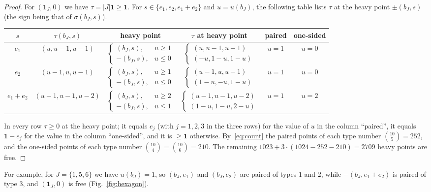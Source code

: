 \documentclass[11pt]{article}
\newcommand{\1}{\mathbf{1}}
\begin{document}
\begin{proof}
For $(\1_J,0)$ we have $\tau=|J|\1\ge\1$. For $s\in\{e_1,e_2,e_1+e_2\}$ and $u=u(b_J)$, the following table lists $\tau$ at
the heavy point $\pm(b_J,s)$ (the sign being that of $\sigma(b_J,s)$).
\begin{center}
\setlength{\tabcolsep}{5pt}
\begin{tabular}{cccccc}
\toprule
$s$ & $\tau(b_J,s)$ & heavy point & $\tau$ at heavy point & paired & one-sided\\
\midrule
$e_1$ & $(u,u-1,u-1)$ & $\begin{cases}(b_J,s),&u\ge1\\-(b_J,s),&u\le0\end{cases}$ &
$\begin{cases}(u,u-1,u-1)\\(-u,1-u,1-u)\end{cases}$ & $u=1$ & $u=0$\\
\addlinespace
$e_2$ & $(u-1,u,u-1)$ & $\begin{cases}(b_J,s),&u\ge1\\-(b_J,s),&u\le0\end{cases}$ &
$\begin{cases}(u-1,u,u-1)\\(1-u,-u,1-u)\end{cases}$ & $u=1$ & $u=0$\\
\addlinespace
$e_1+e_2$ & $(u-1,u-1,u-2)$ & $\begin{cases}(b_J,s),&u\ge2\\-(b_J,s),&u\le1\end{cases}$ &
$\begin{cases}(u-1,u-1,u-2)\\(1-u,1-u,2-u)\end{cases}$ & $u=1$ & $u=2$\\
\bottomrule
\end{tabular}
\end{center}
In every row $\tau\ge0$ at the heavy point; it equals $e_j$ (with $j=1,2,3$ in the three rows) for the value of $u$ in the
column ``paired'', it equals $\1-e_j$ for the value in the column ``one-sided'', and it is $\ge\1$ otherwise.
By~\eqref{eq:count} the paired points of each type number $\binom{10}{5}=252$, and the one-sided points of each type number
$\binom{10}{4}=\binom{10}{6}=210$. The remaining $1023+3\cdot(1024-252-210)=2709$ heavy points are free.
\end{proof}

For example, for $J=\{1,5,6\}$ we have $u(b_J)=1$, so $(b_J,e_1)$ and $(b_J,e_2)$ are paired of types $1$ and $2$, while
$-(b_J,e_1+e_2)$ is paired of type $3$, and $(\1_J,0)$ is free (Fig.~\ref{fig:hexagon}).
\end{document}
